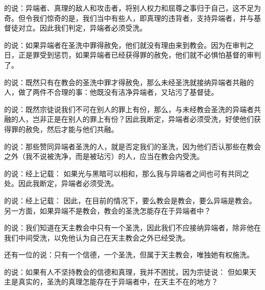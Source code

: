的说：异端者、真理的敌人和攻击者，将别人权力和屈尊之事归于自己，这不足为奇。但令我们惊奇的是，我们当中有些人，即真理的违背者，支持异端者，并与基督徒对立。因此我们判定，异端者必须受洗。\par

的说：如果异端者在圣洗中罪得赦免，他们就没有理由来到教会。因为在审判之日，正是罪受到惩罚，如果异端者已经获得罪的赦免，他们就不必惧怕基督的审判了。\par

的说：既然只有在教会的圣洗中罪才得赦免，那么未经圣洗就接纳异端者共融的人，做了两件不合理的事：他既没有洁净异端者，又玷污了基督徒。\par

的说：既然宗徒说我们不可在别人的罪上有份，那么，与未经教会圣洗的异端者共融的人，岂非正是在别人的罪上有份？因此我断定，异端者必须受洗，好使他们获得罪的赦免，然后才能与他们共融。\par

的说：那些赞同异端者圣洗的人，就是否定我们的圣洗，因为他们否认那些在教会之外（我不说被洗净，而是被玷污）的人，应当在教会内受洗。\par

的说：经上记载：  如果光与黑暗可以相和，那么我与异端者之间也可有共同之处。因此我断定，异端者必须受洗。\par

的说：经上记载：  因此，在目前的情况下，要么教会是教会，要么异端是教会。另一方面，如果异端不是教会，教会的圣洗怎能存在于异端者中？\par

的说：我们知道在天主教会中只有一个圣洗，因此我们不应接纳异端者，除非他在我们中间受洗，以免他认为自己在天主教会之外已经受洗。\par

还有一位的说：只有一个信德，一个圣洗，但属于天主教会，唯独她有权施洗。\par

的说：如果有人不坚持教会的信德和真理，我并不困扰，因为宗徒说：  但如果天主是真实的，圣洗的真理怎能存在于异端者中，在天主不在的地方？\par

